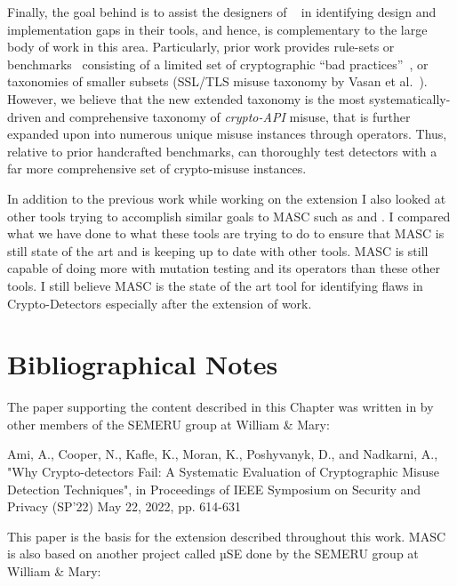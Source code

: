 Finally, the goal behind \tool is to assist the designers of \detectors~\cite{fhm+12,ebfk13,cognicrypteclipse,knr+17,KSA+18,deepsource,snyk,sonarqube,codeguru,codiga} in identifying design and implementation gaps in their tools, and hence, \tool is complementary to the large body of work in this area.
Particularly, prior work provides rule-sets or benchmarks~\cite{BDA+17,BDA+19} consisting of a limited set of cryptographic ``bad practices''~\cite{BD16}, or taxonomies of smaller subsets (\eg SSL/TLS misuse taxonomy by Vasan et al.~\cite{NVK16}).
However, we believe that the new extended taxonomy is the most systematically-driven and comprehensive taxonomy of {\em crypto-API} misuse, that is further expanded upon into numerous unique misuse instances through \tools operators.
Thus, relative to prior handcrafted benchmarks, \tool can thoroughly test detectors with a far more comprehensive set of crypto-misuse instances.

In addition to the previous work while working on the extension I also looked at other tools trying to accomplish similar goals to MASC such as \cite{Afrose_Xiao_Rahaman_Miller_Yao_2022} and \cite{Schlichtig_Wickert_Krüger_Bodden_Mezini_2022}. I compared what we have done to what these tools are trying to do to ensure that MASC is still state of the art and is keeping up to date with other tools. MASC is still capable of doing more with mutation testing and its operators than these other tools. I still believe MASC is the state of the art tool for identifying flaws in Crypto-Detectors especially after the extension of work.






\section{Bibliographical Notes}
\label{ch1:sec:bibliographicalNotes}

The paper supporting the content described in this Chapter was written in by other members of the SEMERU group at William \& Mary:

Ami, A., Cooper, N., Kafle, K., Moran, K., Poshyvanyk, D., and Nadkarni, A., "Why Crypto-detectors Fail: A Systematic Evaluation of Cryptographic Misuse Detection Techniques", in Proceedings of IEEE Symposium on Security and Privacy (SP'22) May 22, 2022, pp. 614-631

This paper is the basis for the extension described throughout this work. MASC is also based on another project called µSE done by the SEMERU group at William \& Mary:

